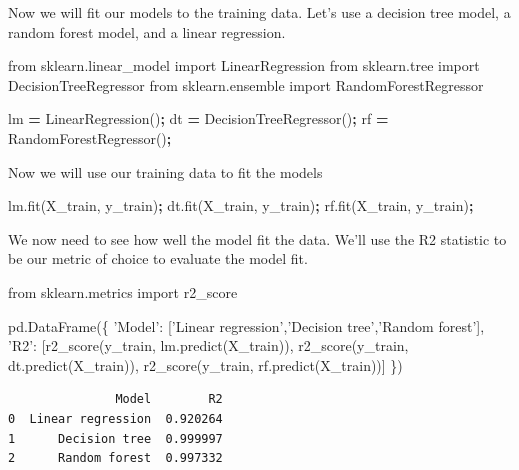 \documentclass[
  letterpaper,
]{scrbook}
\newenvironment{Shaded}{\begin{snugshade}}{\end{snugshade}}
\newcommand{\ImportTok}[1]{#1}
\newcommand{\NormalTok}[1]{#1}
\newcommand{\OperatorTok}[1]{\textcolor[rgb]{0.81,0.36,0.00}{\textbf{#1}}}
\newcommand{\StringTok}[1]{\textcolor[rgb]{0.31,0.60,0.02}{#1}}
\begin{document}
Now we will fit our models to the training data. Let's use a decision tree model, a random forest model, and a linear regression.

\begin{Shaded}
\begin{Highlighting}[]
\ImportTok{from}\NormalTok{ sklearn.linear_model }\ImportTok{import}\NormalTok{ LinearRegression}
\ImportTok{from}\NormalTok{ sklearn.tree }\ImportTok{import}\NormalTok{ DecisionTreeRegressor}
\ImportTok{from}\NormalTok{ sklearn.ensemble }\ImportTok{import}\NormalTok{ RandomForestRegressor}

\NormalTok{lm }\OperatorTok{=}\NormalTok{ LinearRegression()}\OperatorTok{;}
\NormalTok{dt }\OperatorTok{=}\NormalTok{ DecisionTreeRegressor()}\OperatorTok{;}
\NormalTok{rf }\OperatorTok{=}\NormalTok{ RandomForestRegressor()}\OperatorTok{;}
\end{Highlighting}
\end{Shaded}

Now we will use our training data to fit the models

\begin{Shaded}
\begin{Highlighting}[]
\NormalTok{lm.fit(X_train, y_train)}\OperatorTok{;}
\NormalTok{dt.fit(X_train, y_train)}\OperatorTok{;}
\NormalTok{rf.fit(X_train, y_train)}\OperatorTok{;}
\end{Highlighting}
\end{Shaded}

We now need to see how well the model fit the data. We'll use the R2 statistic to be our metric of choice to evaluate the model fit.

\begin{Shaded}
\begin{Highlighting}[]
\ImportTok{from}\NormalTok{ sklearn.metrics }\ImportTok{import}\NormalTok{  r2_score}

\NormalTok{pd.DataFrame(\{}
  \StringTok{'Model'}\NormalTok{: [}\StringTok{'Linear regression'}\NormalTok{,}\StringTok{'Decision tree'}\NormalTok{,}\StringTok{'Random forest'}\NormalTok{],}
  \StringTok{'R2'}\NormalTok{: [r2_score(y_train, lm.predict(X_train)),}
\NormalTok{    r2_score(y_train, dt.predict(X_train)),}
\NormalTok{    r2_score(y_train, rf.predict(X_train))]}
\NormalTok{\})}
\end{Highlighting}
\end{Shaded}

\begin{verbatim}
               Model        R2
0  Linear regression  0.920264
1      Decision tree  0.999997
2      Random forest  0.997332
\end{verbatim}
\end{document}
